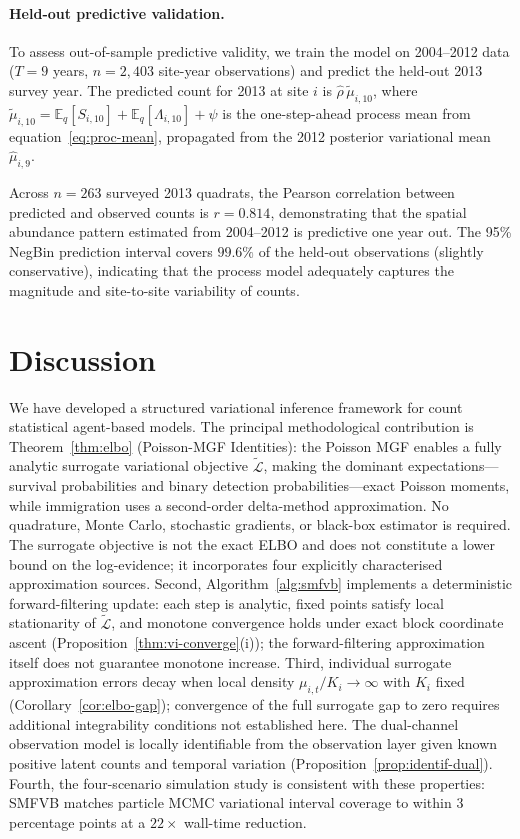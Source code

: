 \documentclass[review,12pt]{elsarticle}
\theoremstyle{definition}
\begin{document}
\paragraph{Held-out predictive validation.}
To assess out-of-sample predictive validity, we train the model on
2004--2012 data ($T=9$ years, $n=2{,}403$ site-year observations) and
predict the held-out 2013 survey year.  The predicted count for 2013 at
site $i$ is $\hat\rho\,\tilde\mu_{i,10}$, where
$\tilde\mu_{i,10}=\mathbb{E}_q[S_{i,10}]+\mathbb{E}_q[\Lambda_{i,10}]+\psi$
is the one-step-ahead process mean from
equation~\eqref{eq:proc-mean}, propagated from the 2012 posterior
variational mean $\hat\mu_{i,9}$.

Across $n=263$ surveyed 2013 quadrats, the Pearson correlation between
predicted and observed counts is $r=0.814$, demonstrating that the spatial
abundance pattern estimated from 2004--2012 is predictive one year out.
The 95\% NegBin prediction interval covers $99.6\%$ of the held-out
observations (slightly conservative), indicating that the process model
adequately captures the magnitude and site-to-site variability of counts.

\section{Discussion}\label{sec:discussion}

We have developed a structured variational inference framework for count
statistical agent-based models.  The principal methodological contribution
is Theorem~\ref{thm:elbo} (Poisson-MGF Identities): the Poisson MGF enables
a fully analytic surrogate variational objective $\tilde{\mathcal{L}}$,
making the dominant expectations---survival probabilities and binary detection
probabilities---exact Poisson moments, while immigration uses a second-order
delta-method approximation.  No quadrature, Monte Carlo, stochastic gradients,
or black-box estimator is required.  The surrogate objective is not the exact
ELBO and does not constitute a lower bound on the log-evidence; it incorporates
four explicitly characterised approximation sources.  Second, Algorithm~\ref{alg:smfvb}
implements a deterministic forward-filtering update: each step is analytic,
fixed points satisfy local stationarity of $\tilde{\mathcal{L}}$, and
monotone convergence holds under exact block coordinate ascent
(Proposition~\ref{thm:vi-converge}(i)); the forward-filtering approximation
itself does not guarantee monotone increase.  Third, individual surrogate
approximation errors decay when local density $\mu_{i,t}/K_i\to\infty$
with $K_i$ fixed (Corollary~\ref{cor:elbo-gap}); convergence of the full
surrogate gap to zero requires additional integrability conditions not
established here.  The dual-channel observation model is locally identifiable
from the observation layer given known positive latent counts and temporal
variation (Proposition~\ref{prop:identif-dual}).  Fourth, the four-scenario
simulation study is consistent with these properties: SMFVB matches particle
MCMC variational interval coverage to within 3 percentage points at a $22\times$
wall-time reduction.
\end{document}
